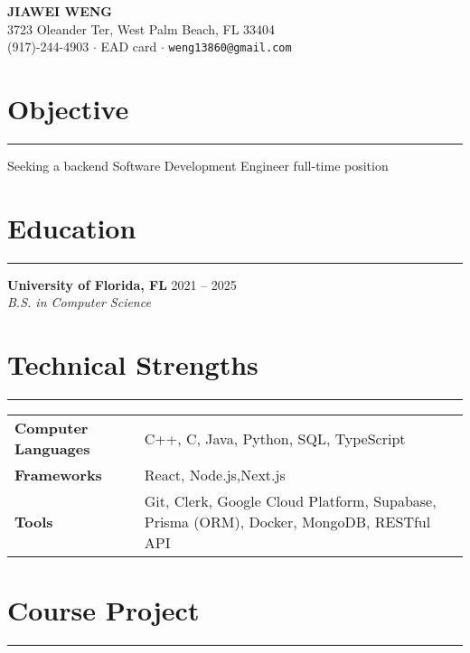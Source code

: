\documentclass[11pt]{article}
\begin{document}
\begin{center}
    {\large \textbf{JIAWEI WENG}}\\  %
    3723 Oleander Ter, West Palm Beach, FL 33404 \\
    (917)-244-4903 \(\cdot\) EAD card \(\cdot\) \texttt{weng13860@gmail.com}
\end{center}

\section*{Objective}  
\vspace{-1.0em}
\hrule
\vspace{0.5em}

Seeking a backend Software Development Engineer full-time position

\section*{Education}
\vspace{-1.0em}
\hrule
\vspace{0.5em}

\textbf{University of Florida, FL} \hfill 2021 -- 2025\\
\textit{B.S. in Computer Science}

\section*{Technical Strengths}
\vspace{-1.0em}
\hrule
\vspace{0.5em}

\begin{tabular}{@{} l p{12cm}}
\textbf{Computer Languages} & C++, C, Java, Python, SQL, TypeScript \\
\textbf{Frameworks}         & React, Node.js,Next.js \\
\textbf{Tools}              & Git, Clerk, Google Cloud Platform, Supabase, Prisma (ORM), Docker, MongoDB, RESTful API \\
\end{tabular}

\section*{Course Project}
\vspace{-1.0em}
\hrule
\vspace{0.5em}
\end{document}

